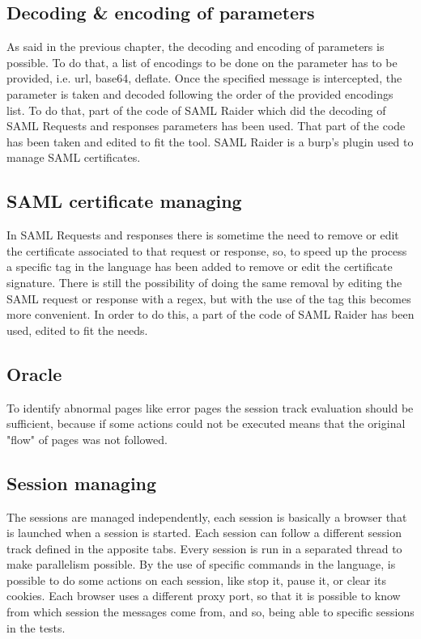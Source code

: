 \subsection{Decoding \& encoding of parameters}
As said in the previous chapter, the decoding and encoding of parameters is possible. To do that, a list of encodings to be done on the parameter has to be provided, i.e. url, base64, deflate. Once the specified message is intercepted, the parameter is taken and decoded following the order of the provided encodings list. To do that, part of the code of SAML Raider \cite{saml_raider} which did the decoding of \Gls{SAML} Requests and responses parameters has been used. That part of the code has been taken and edited to fit the tool. SAML Raider is a \Gls{burp}'s plugin used to manage \Gls{SAML} certificates.

\subsection{SAML certificate managing}
In \Gls{SAML} Requests and responses there is sometime the need to remove or edit the certificate associated to that request or response, so, to speed up the process a specific tag in the language has been added to remove or edit the certificate signature. There is still the possibility of doing the same removal by editing the \Gls{SAML} request or response with a regex, but with the use of the tag this becomes more convenient.
In order to do this, a part of the code of SAML Raider \cite{saml_raider} has been used, edited to fit the needs.

\subsection{Oracle}
To identify abnormal pages like error pages the \gls{session track} evaluation should be sufficient, because if some actions could not be executed means that the original "flow" of pages was not followed.

\subsection{Session managing}
The sessions are managed independently, each session is basically a browser that is launched when a session is started. Each session can follow a different \gls{session track} defined in the apposite tabs. Every session is run in a separated thread to make parallelism possible. By the use of specific commands in the language, is possible to do some actions on each session, like stop it, pause it, or clear its cookies. Each browser uses a different proxy port, so that it is possible to know from which session the messages come from, and so, being able to specific sessions in the tests.







